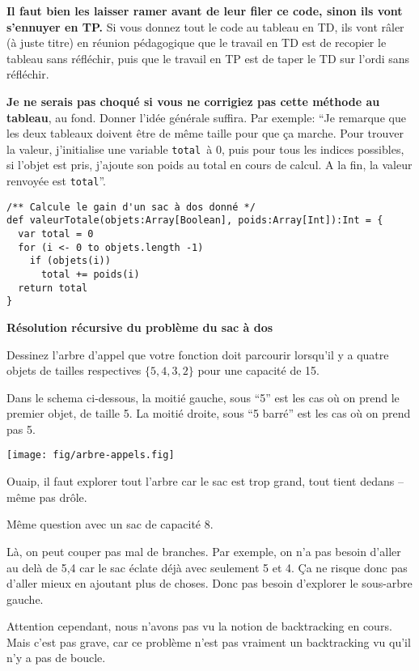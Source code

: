 \documentclass[10pt]{article}\usepackage[correction,nu]{esial}
\begin{document}
\begin{Reponse}
  \textbf{Il faut bien les laisser ramer avant de leur filer ce code, sinon ils
    vont s'ennuyer en TP.} Si vous donnez tout le code au tableau en TD, ils
  vont râler (à juste titre) en réunion pédagogique que le travail en TD est de
  recopier le tableau sans réfléchir, puis que le travail en TP est de taper le
  TD sur l'ordi sans réfléchir.

  \textbf{Je ne serais pas choqué si vous ne corrigiez pas cette méthode au
    tableau}, au fond. Donner l'idée générale suffira. Par exemple: ``Je
  remarque que les deux tableaux doivent être de même taille pour que ça
  marche. Pour trouver la valeur, j'initialise une variable \texttt{total }à 0,
  puis pour tous les indices possibles, si l'objet est pris, j'ajoute son poids
  au total en cours de calcul. A la fin, la valeur renvoyée est
  \texttt{total}''.
\begin{Verbatim}
/** Calcule le gain d'un sac à dos donné */
def valeurTotale(objets:Array[Boolean], poids:Array[Int]):Int = {
  var total = 0
  for (i <- 0 to objets.length -1)
    if (objets(i)) 
      total += poids(i)
  return total
}  
\end{Verbatim}
\end{Reponse}

\Exercice\textbf{Résolution récursive du problème du sac à dos}

\Question Dessinez l'arbre d'appel que votre fonction doit parcourir lorsqu'il
y a quatre objets de tailles respectives $\{ 5, 4, 3, 2 \}$ pour une capacité
de 15.

\begin{Reponse}
  Dans le schema ci-dessous, la moitié gauche, sous ``5'' est les cas où on
  prend le premier objet, de taille 5. La moitié droite, sous ``5 barré'' est
  les cas où on prend pas 5.

  \texttt{[image: fig/arbre-appels.fig]}  

  Ouaip, il faut explorer tout l'arbre car le sac est trop grand, tout tient
  dedans -- même pas drôle.
\end{Reponse}

\Question Même question avec un sac de capacité 8.

\begin{Reponse}
  Là, on peut  couper pas mal de branches. Par exemple, on n'a pas besoin d'aller au
  delà de 5,4 car le sac éclate déjà avec seulement 5 et 4. Ça ne risque donc
  pas d'aller mieux en ajoutant plus de choses. Donc pas besoin d'explorer le
  sous-arbre gauche.

  Attention cependant, nous n'avons pas vu la notion de backtracking en
  cours. Mais c'est pas grave, car ce problème n'est pas vraiment un
  backtracking vu qu'il n'y a pas de boucle.
\end{Reponse}
\end{document}
